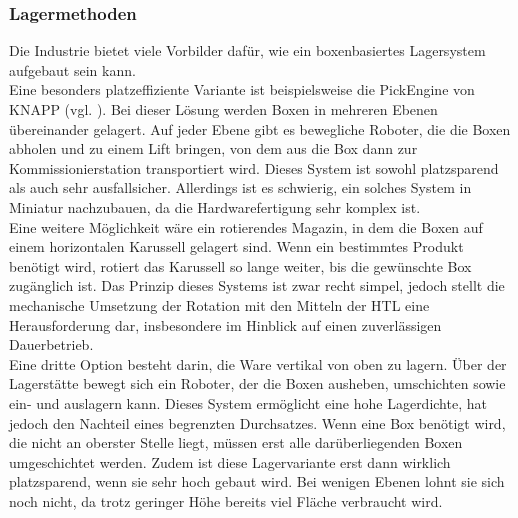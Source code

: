 \subsubsection{Lagermethoden}
Die Industrie bietet viele Vorbilder dafür, wie ein boxenbasiertes Lagersystem aufgebaut sein kann.
\\
Eine besonders platzeffiziente Variante ist beispielsweise die PickEngine von KNAPP (vgl. \cite{pickengine}). Bei dieser Lösung werden Boxen in mehreren Ebenen übereinander gelagert. Auf jeder Ebene gibt es bewegliche Roboter, die die Boxen abholen und zu einem Lift bringen, von dem aus die Box dann zur Kommissionierstation transportiert wird. Dieses System ist sowohl platzsparend als auch sehr ausfallsicher. Allerdings ist es schwierig, ein solches System in Miniatur nachzubauen, da die Hardwarefertigung sehr komplex ist.
\\
Eine weitere Möglichkeit wäre ein rotierendes Magazin, in dem die Boxen auf einem horizontalen Karussell gelagert sind. Wenn ein bestimmtes Produkt benötigt wird, rotiert das Karussell so lange weiter, bis die gewünschte Box zugänglich ist. Das Prinzip dieses Systems ist zwar recht simpel, jedoch stellt die mechanische Umsetzung der Rotation mit den Mitteln der HTL eine Herausforderung dar, insbesondere im Hinblick auf einen zuverlässigen Dauerbetrieb.
\\
Eine dritte Option besteht darin, die Ware vertikal von oben zu lagern. Über der Lagerstätte bewegt sich ein Roboter, der die Boxen ausheben, umschichten sowie ein- und auslagern kann. Dieses System ermöglicht eine hohe Lagerdichte, hat jedoch den Nachteil eines begrenzten Durchsatzes. Wenn eine Box benötigt wird, die nicht an oberster Stelle liegt, müssen erst alle darüberliegenden Boxen umgeschichtet werden. Zudem ist diese Lagervariante erst dann wirklich platzsparend, wenn sie sehr hoch gebaut wird. Bei wenigen Ebenen lohnt sie sich noch nicht, da trotz geringer Höhe bereits viel Fläche verbraucht wird.



